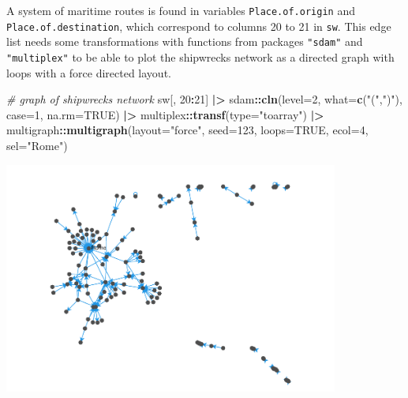 \documentclass[a4paper,11pt]{memoir}
\newenvironment{Shaded}{\begin{snugshade}}{\end{snugshade}}
\newcommand{\CommentTok}[1]{\textcolor[rgb]{0.56,0.35,0.01}{\textit{#1}}}
\newcommand{\DataTypeTok}[1]{\textcolor[rgb]{0.13,0.29,0.53}{#1}}
\newcommand{\DecValTok}[1]{\textcolor[rgb]{0.00,0.00,0.81}{#1}}
\newcommand{\ErrorTok}[1]{\textcolor[rgb]{0.64,0.00,0.00}{\textbf{#1}}}
\newcommand{\KeywordTok}[1]{\textcolor[rgb]{0.13,0.29,0.53}{\textbf{#1}}}
\newcommand{\NormalTok}[1]{#1}
\newcommand{\OperatorTok}[1]{\textcolor[rgb]{0.81,0.36,0.00}{\textbf{#1}}}
\newcommand{\OtherTok}[1]{\textcolor[rgb]{0.56,0.35,0.01}{#1}}
\newcommand{\StringTok}[1]{\textcolor[rgb]{0.31,0.60,0.02}{#1}}
\begin{document}
A system of maritime routes is found in variables
\texttt{Place.of.origin} and \texttt{Place.of.destination}, which
correspond to columns 20 to 21 in \texttt{sw}. This edge list needs some
transformations with functions from packages \texttt{"sdam"} and
\texttt{"multiplex"} to be able to plot the shipwrecks network as a
directed graph with loops with a force directed layout.

\begin{Shaded}
\begin{Highlighting}[]
\CommentTok{# graph of shipwrecks network}
\NormalTok{sw[, }\DecValTok{20}\OperatorTok{:}\DecValTok{21}\NormalTok{] }\OperatorTok{|}\ErrorTok{>}\StringTok{ }
\StringTok{  }\NormalTok{sdam}\OperatorTok{::}\KeywordTok{cln}\NormalTok{(}\DataTypeTok{level=}\DecValTok{2}\NormalTok{, }\DataTypeTok{what=}\KeywordTok{c}\NormalTok{(}\StringTok{"("}\NormalTok{,}\StringTok{")"}\NormalTok{), }\DataTypeTok{case=}\DecValTok{1}\NormalTok{, }\DataTypeTok{na.rm=}\OtherTok{TRUE}\NormalTok{) }\OperatorTok{|}\ErrorTok{>}\StringTok{ }
\StringTok{  }\NormalTok{multiplex}\OperatorTok{::}\KeywordTok{transf}\NormalTok{(}\DataTypeTok{type=}\StringTok{"toarray"}\NormalTok{) }\OperatorTok{|}\ErrorTok{>}\StringTok{ }
\StringTok{  }\NormalTok{multigraph}\OperatorTok{::}\KeywordTok{multigraph}\NormalTok{(}\DataTypeTok{layout=}\StringTok{"force"}\NormalTok{, }\DataTypeTok{seed=}\DecValTok{123}\NormalTok{, }\DataTypeTok{loops=}\OtherTok{TRUE}\NormalTok{, }\DataTypeTok{ecol=}\DecValTok{4}\NormalTok{, }\DataTypeTok{sel=}\StringTok{"Rome"}\NormalTok{)}
\end{Highlighting}
\end{Shaded}

{\centering
\includegraphics[width=11cm, trim=0 0 0 0, clip]{img/unnamed-chunk-12-1} %
}
\end{document}
